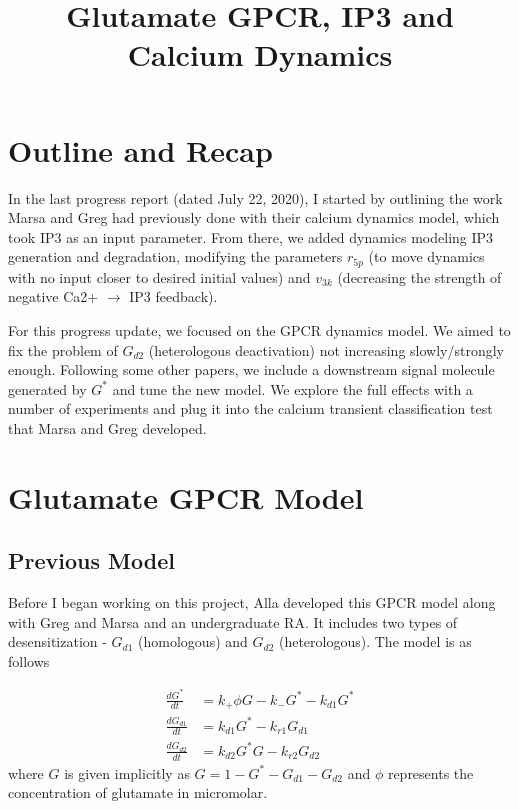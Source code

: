\documentclass[12pt]{article}
\title{Glutamate GPCR, IP3 and Calcium Dynamics}
\begin{document}
\maketitle

\tableofcontents

\pagebreak

\section{Outline and Recap}

In the last progress report (dated July 22, 2020), I started by outlining the work Marsa and Greg had previously done with their calcium dynamics model, which took IP3 as an input parameter. From there, we added dynamics modeling IP3 generation and degradation, modifying the parameters $r_{5p}$ (to move dynamics with no input closer to desired initial values) and $v_{3k}$ (decreasing the strength of negative Ca2+ $\rightarrow$ IP3 feedback). 

For this progress update, we focused on the GPCR dynamics model. We aimed to fix the problem of $G_{d2}$ (heterologous deactivation) not increasing slowly/strongly enough. Following some other papers, we include a downstream signal molecule generated by $G^*$ and tune the new model. We explore the full effects with a number of experiments and plug it into the calcium transient classification test that Marsa and Greg developed.








\section{Glutamate GPCR Model}

\subsection{Previous Model}

Before I began working on this project, Alla developed this GPCR model along with Greg and Marsa and an undergraduate RA. It includes two types of desensitization - $G_{d1}$ (homologous) and $G_{d2}$ (heterologous). The model is as follows

\begin{align*}
\frac{dG^*}{dt} &= k_+ \phi G - k_- G^* - k_{d1} G^* \\
\frac{dG_{d1}}{dt} &= k_{d1}G^* - k_{r1} G_{d1} \\
\frac{dG_{d2}}{dt} &= k_{d2}G^* G - k_{r2} G_{d2}
\end{align*}
where $G$ is given implicitly as $G = 1 - G^* - G_{d1} - G_{d2}$ and $\phi$ represents the concentration of glutamate in micromolar.
\end{document}
